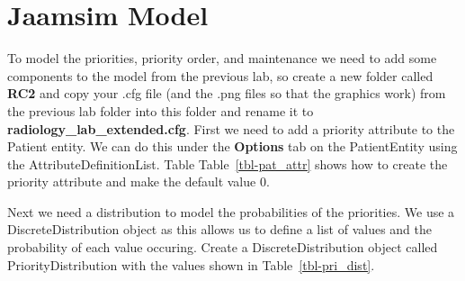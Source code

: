 \documentclass[
  10pt,
  a4paperpaper,
  DIV=11,
  numbers=noendperiod,
  oneside]{scrreprt}
\begin{document}
\section{Jaamsim Model}\label{jaamsim-model-1}

To model the priorities, priority order, and maintenance we need to add
some components to the model from the previous lab, so create a new
folder called \textbf{RC2} and copy your .cfg file (and the .png files
so that the graphics work) from the previous lab folder into this folder
and rename it to \textbf{radiology\_lab\_extended.cfg}. First we need to
add a priority attribute to the Patient entity. We can do this under the
\textbf{Options} tab on the PatientEntity using the
AttributeDefinitionList. Table Table~\ref{tbl-pat_attr} shows how to
create the priority attribute and make the default value 0.

\begin{table}[H]

\caption{\label{tbl-pat_attr}Priority Attribute}


\end{table}%

Next we need a distribution to model the probabilities of the
priorities. We use a DiscreteDistribution object as this allows us to
define a list of values and the probability of each value occuring.
Create a DiscreteDistribution object called PriorityDistribution with
the values shown in Table~\ref{tbl-pri_dist}.

\begin{table}[H]

\caption{\label{tbl-pri_dist}Priority Distribution}


\end{table}%
\end{document}
